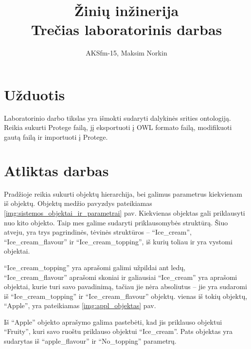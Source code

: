 \documentclass[11pt, a4paper, lithuanian]{article}
\author{AKSfm-15, Maksim Norkin}
\title{Žinių inžinerija\\Trečias laboratorinis darbas}
\begin{document}
    \maketitle

    \section{Užduotis}

    Laboratorinio darbo tikslas yra išmokti sudaryti dalykinės srities ontologiją. Reikia sukurti Protege failą, jį eksportuoti į OWL formato failą, modifikuoti gautą failą ir importuoti į Protege.

    \section{Atliktas darbas}

    Pradžioje reikia sukurti objektų hierarchija, bei galimus parametrus kiekvienam iš objektų. Objektų medžio pavyzdys pateikiamas \ref{img:sistemos_objektai_ir_parametrai} pav. Kiekvienas objektas gali priklausyti nuo kito objekto. Taip mes galime sudaryti priklausomybės struktūrą. Šiuo atveju, yra trys pagrindinės, tėvinės struktūros -- ``Ice\_cream'', ``Ice\_cream\_flavour'' ir ``Ice\_cream\_topping'', iš kurių toliau ir yra vystomi objektai.

    ``Ice\_cream\_topping'' yra aprašomi galimi užpildai ant ledų, ``Ice\_cream\_flavour'' aprašomi skoniai ir galiausiai ``Ice\_cream'' yra aprašomi objektai, kurie turi savo pavadinimą, tačiau jie nėra absoliutus -- jie yra sudaromi iš ``Ice\_cream\_topping'' ir ``Ice\_cream\_flavour'' objektų. vienas iš tokių objektų, ``Apple'', yra pateikiamas \ref{img:appl_objektas} pav.

    Iš ``Apple'' objekto aprašymo galima pastebėti, kad jis priklauso objektui ``Fruity'', kuri savo ruoštu priklauso objektui ``Ice\_cream''. Pats objektas yra sudarytas iš ``apple\_flavour'' ir ``No\_topping'' parametrų.
\end{document}
